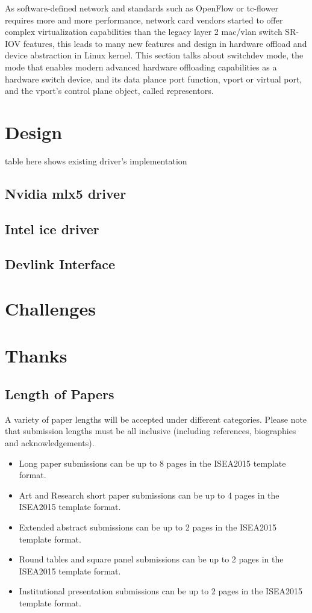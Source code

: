 \documentclass[letterpaper]{article}
\begin{document}
As software-defined network and standards such as OpenFlow or tc-flower
requires more and more performance, network card vendors started to offer
complex virtualization capabilities than the legacy layer 2 mac/vlan switch
SR-IOV features, this leads to many new features and design in hardware offload
and device abstraction in Linux kernel.
This section talks about switchdev mode, the mode that enables
modern advanced hardware offloading capabilities as a hardware switch device,
and its data plance port function, vport or virtual port, and the vport's
control plane object, called representors.

\section{Design}
table here shows existing driver's implementation

\subsection{Nvidia mlx5 driver}
\subsection{Intel ice driver}
\subsection{Devlink Interface}

\section{Challenges}
\section{Thanks}

\subsection{Length of Papers}
A variety of paper lengths will be accepted under different categories. Please note that submission lengths must be all inclusive (including references, biographies and acknowledgements).
\begin{itemize}
\item Long paper submissions can be up to 8 pages in the ISEA2015 template format.
\item Art and Research short paper submissions can be up to 4 pages in the ISEA2015 template format.
\item Extended abstract submissions can be up to 2 pages in the ISEA2015 template format.
\item Round tables and square panel submissions can be up to 2 pages in the ISEA2015 template format.
\item Institutional presentation submissions can be up to 2 pages in the ISEA2015 template format.
\end{itemize}
\end{document}
